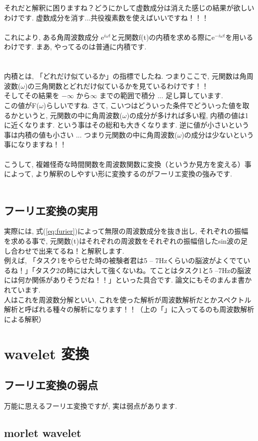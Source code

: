 \documentclass[11pt,a4paper]{jreport}
\begin{document}
それだと解釈に困りますね？どうにかして虚数成分は消えた感じの結果が欲しいわけです. 虚数成分を消す...共役複素数を使えばいいですね！！！\\
\\
これにより, ある角周波数成分 $\mathrm{e}^{i\omega t}$と元関数f(t)の内積を求める際に$\mathrm{e}^{-i\omega t}$を用いるわけです. まあ, やってるのは普通に内積です.\\
\\
\\
内積とは, 「どれだけ似ているか」の指標でしたね. つまりここで, 元関数は角周波数($\omega$)の三角関数とどれだけ似ているかを見ているわけです！！\\
そしてその結果を $-\infty$ から$\infty$ までの範囲で積分 ... 足し算しています.\\
この値がF($\omega$)らしいですね. さて, こいつはどういった条件でどういった値を取るかというと, 元関数の中に角周波数($\omega$)の成分が多ければ多い程, 内積の値は1に近くなります. という事はその総和も大きくなります. 逆に値が小さいという事は内積の値も小さい ... つまり元関数の中に角周波数($\omega$)の成分は少ないという事になりますね！！\\
\\
こうして, 複雑怪奇な時間関数を周波数関数に変換（というか見方を変える）事によって, より解釈のしやすい形に変換するのがフーリエ変換の強みです.\\
\\
\subsection{フーリエ変換の実用}
実際には, 式(\ref{eq:furier})によって無限の周波数成分を抜き出し, それぞれの振幅を求める事で, 元関数(t)はそれぞれの周波数をそれぞれの振幅倍したsin波の足し合わせで出来てるね！と解釈します.\\
例えば, 「タスク1をやらせた時の被験者君は5 -- 7Hzくらいの脳波がよくでているね！」「タスク2の時には大して強くないね。てことはタスク1と5 --7Hzの脳波には何か関係がありそうだね！！」といった具合です. 論文にもそのまんま書かれています.
\\
人はこれを周波数分解といい, これを使った解析が周波数解析だとかスペクトル解析と呼ばれる種々の解析になります！！（上の「」に入ってるのも周波数解析による解釈）
\section{wavelet 変換}
\subsection{フーリエ変換の弱点}
万能に思えるフーリエ変換ですが, 実は弱点があります.
\subsection{morlet wavelet}
\end{document}
